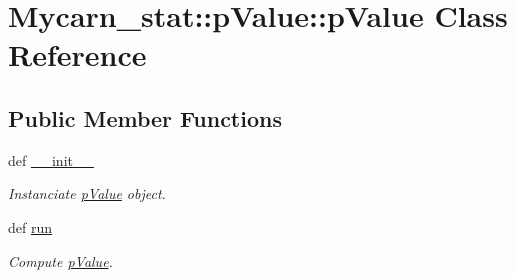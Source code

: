 \hypertarget{classMycarn__stat_1_1pValue_1_1pValue}{
\section{\-Mycarn\-\_\-stat\-:\-:p\-Value\-:\-:p\-Value \-Class \-Reference}
\label{classMycarn__stat_1_1pValue_1_1pValue}
}
\subsection*{\-Public \-Member \-Functions}
\begin{DoxyCompactItemize}
\item 
\hypertarget{classMycarn__stat_1_1pValue_1_1pValue_af46cf04d9397042509300f40cdfd60cb}{
def \hyperlink{classMycarn__stat_1_1pValue_1_1pValue_af46cf04d9397042509300f40cdfd60cb}{\-\_\-\-\_\-init\-\_\-\-\_\-}}
\label{classMycarn__stat_1_1pValue_1_1pValue_af46cf04d9397042509300f40cdfd60cb}

\begin{DoxyCompactList}\small\item\em \-Instanciate \hyperlink{classMycarn__stat_1_1pValue_1_1pValue}{p\-Value} object. \end{DoxyCompactList}\item 
\hypertarget{classMycarn__stat_1_1pValue_1_1pValue_ac5ac5b2096099018d361ed7509e771b3}{
def \hyperlink{classMycarn__stat_1_1pValue_1_1pValue_ac5ac5b2096099018d361ed7509e771b3}{run}}
\label{classMycarn__stat_1_1pValue_1_1pValue_ac5ac5b2096099018d361ed7509e771b3}

\begin{DoxyCompactList}\small\item\em \-Compute \hyperlink{classMycarn__stat_1_1pValue_1_1pValue}{p\-Value}. \end{DoxyCompactList}\end{DoxyCompactItemize}
